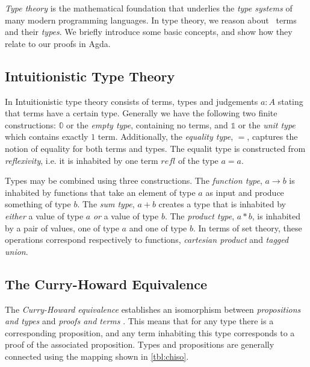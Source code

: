 \documentclass[a4paper,msc,twosized=semi]{uustthesis}
\begin{document}
  \emph{Type theory} is the mathematical foundation that underlies the \emph{type 
  systems} of many modern programming languages. In type theory, we reason about \emph\
  {terms} and their \emph{types}. We briefly introduce some basic concepts, and show 
  how they relate to our proofs in Agda. 

  \subsection{Intuitionistic Type Theory}

  In Intuitionistic type theory consists of terms, types and judgements $a : A$ 
  stating that terms have a certain type. Generally we have the following two finite 
  constructions: $\mathbb{0}$ or the \emph{empty type}, containing no terms, and 
  $\mathbb{1}$ or the \emph{unit type} which contains exactly $1$ term. Additionally,
  the \emph{equality type}, $=$, captures the notion of equality for both terms and 
  types. The equalit type is constructed from \emph{reflexivity}, i.e. it is 
  inhabited by one term $refl$ of the type $a = a$. 

  Types may be combined using three constructions. The \emph{function type}, $a 
  \rightarrow b$ is inhabited by functions that take an element of type $a$ as input 
  and produce something of type $b$. The \emph{sum type}, $a + b$ creates a type that 
  is inhabited by \emph{either} a value of type $a$ \emph{or} a 
  value of type $b$. The \emph{product type}, $a * b$, is inhabited by a pair of 
  values, one of type $a$ and one of type $b$. In terms of set theory, these 
  operations correspond respectively to functions, \emph{cartesian product} and \emph
  {tagged union}. 

  \subsection{The Curry-Howard Equivalence}

  The \emph{Curry-Howard equivalence} establishes an isomorphism between \emph
  {propositions and types} and \emph{proofs and terms} \cite{wadler2015propositions}. 
  This means that for any type there is a corresponding proposition, and any term 
  inhabiting this type corresponds to a proof of the associated proposition. Types and 
  propositions are generally connected using the mapping shown in \cref{tbl:chiso}.
\end{document}
